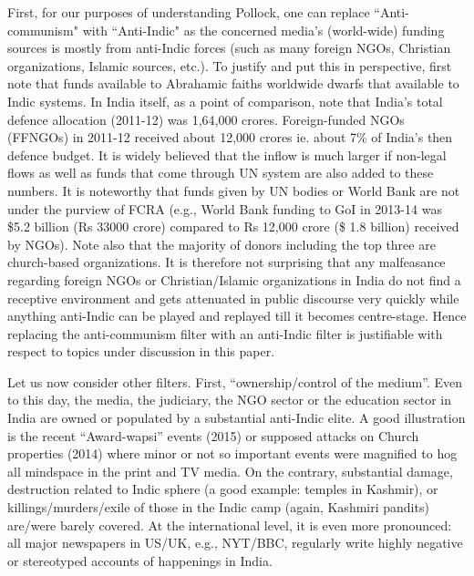 First, for our purposes of understanding Pollock, one can replace ``Anti-communism" with ``Anti-Indic" as the concerned media’s (world-wide) funding sources is mostly from anti-Indic forces (such as many foreign NGOs, Christian organizations, Islamic sources, etc.). To justify and put this in perspective, first note that funds available to Abrahamic faiths worldwide dwarfs that available to Indic systems. In India itself, as a point of comparison, note that India’s total defence allocation (2011-12) was 1,64,000 crores. Foreign-funded NGOs (FFNGOs) in 2011-12 received about 12,000 crores ie. about 7\% of India's then defence budget. It is widely believed that the inflow is much larger if non-legal flows as well as funds that come through UN system are also added to these numbers. It is noteworthy that funds given by UN bodies or World Bank are not under the purview of FCRA (e.g., World Bank funding to GoI in 2013-14 was \$5.2 billion (Rs 33000 crore) compared to Rs 12,000 crore (\$ 1.8 billion) received by NGOs). Note also that the majority of donors including the top three are church-based organizations. It is therefore not surprising that any malfeasance regarding foreign NGOs or Christian/Islamic organizations in India do not find a receptive environment and gets attenuated in public discourse very quickly while anything anti-Indic can be played and replayed till it becomes centre-stage. Hence replacing the anti-communism filter with an anti-Indic filter is justifiable with respect to topics under discussion in this paper.

Let us now consider other filters. First, “ownership/control of the medium”. Even to this day, the media, the judiciary, the NGO sector or the education sector in India are owned or populated by a substantial anti-Indic elite. A good illustration is the recent “Award-wapsi” events (2015) or supposed attacks on Church properties (2014) where minor or not so important events were magnified to hog all mindspace in the print and TV media.  On the contrary, substantial damage, destruction related to Indic sphere (a good example: temples in Kashmir), or killings/murders/exile of those in the Indic camp (again, Kashmiri pandits) are/were barely covered. At the international level, it is even more pronounced: all major newspapers in US/UK, e.g., NYT/BBC, regularly write highly negative or stereotyped accounts of happenings in India.

